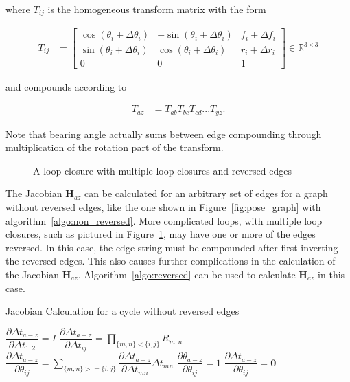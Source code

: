 where $T_{ij}$ is the  homogeneous transform matrix with the form

\begin{align*}
  T_{ij} &= \left[\begin{array}{ccc}
  \cos(\theta_i + \Delta\theta_i) & -\sin(\theta_i + \Delta\theta_i) & f_i + \Delta f_i \\
  \sin(\theta_i + \Delta\theta_i) &  \cos(\theta_i + \Delta\theta_i) & r_i + \Delta r_i \\ 0 & 0 & 1
\end{array}\right] \in \mathbb{R}^{3 \times 3}
\end{align*}

and compounds according to

\begin{align*}
  T_{az} &= T_{ab} T_{bc} T_{cd} ... T_{yz}.
\end{align*}

Note that bearing angle actually sums between edge compounding through multiplication of the rotation part of the transform.

\begin{figure}[H]
  
  \caption{A loop closure with multiple loop closures and reversed edges}
  \label{fig:reversed_pose_graph}
\end{figure}

The Jacobian $\mathbf{H}_{az}$ can be calculated for an arbitrary set of edges for a graph without reversed edges, like the one shown in Figure~\ref{fig:pose_graph} with algorithm~\ref{algo:non_reversed}.  More complicated loops, with multiple loop closures, such as pictured in Figure~\ref{fig:reversed_pose_graph}, may have one or more of the edges reversed.  In this case, the edge string must be compounded after first inverting the reversed edges.  This also causes further complications in the calculation of the Jacobian $\mathbf{H}_{az}$.  Algorithm~\ref{algo:reversed} can be used to calculate $\mathbf{H}_{az}$ in this case.

\begin{algorithm}[H]
  \caption{Jacobian Calculation for a cycle without reversed edges}\label{algo:non_reversed}
  \begin{algorithmic}[1]
    \State $\dfrac{\partial \Delta t_{a-z}}{\partial \Delta t_{1,2}} = I$
      \State $\dfrac{\partial \Delta t_{a-z}}{\partial \Delta t_{ij}} = \prod_{\{m,n\} < \{i,j\}} R_{m,n}$
    \EndFor
      \State $\dfrac{\partial \Delta t_{a-z}}{\partial \theta_{ij}} = \sum_{\{m,n\} >= \{i,j\}} \dfrac{\partial \Delta t_{a-z}}{\partial \Delta t_{mn}} \Delta t_{mn}$
      \State $\dfrac{\partial \theta_{a-z}}{\partial \theta_{ij}} = 1$
      \State $\dfrac{\partial \Delta t_{a-z}}{\partial \theta_{ij}} = \textbf{0}$
    \EndFor
  \end{algorithmic}
\end{algorithm}

